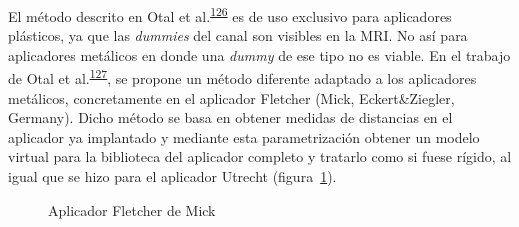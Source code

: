 \documentclass[
  a4paper,
]{scrreprt}
\begin{document}
El método descrito en Otal et
al.\textsuperscript{\protect\hyperlink{ref-otal2019_plastic}{126}} es de
uso exclusivo para aplicadores plásticos, ya que las \emph{dummies} del
canal son visibles en la MRI. No así para aplicadores metálicos en donde
una \emph{dummy} de ese tipo no es viable. En el trabajo de Otal et
al.\textsuperscript{\protect\hyperlink{ref-otal2019_metal}{127}}, se
propone un método diferente adaptado a los aplicadores metálicos,
concretamente en el aplicador Fletcher (Mick, Eckert\&Ziegler, Germany).
Dicho método se basa en obtener medidas de distancias en el aplicador ya
implantado y mediante esta parametrización obtener un modelo virtual
para la biblioteca del aplicador completo y tratarlo como si fuese
rígido, al igual que se hizo para el aplicador Utrecht
(figura~\ref{fig-fletcher}).

\begin{figure}

\begin{minipage}[t]{\linewidth}

{\centering 


}

\end{minipage}%
\newline
\begin{minipage}[t]{\linewidth}

{\centering 


}

\end{minipage}%

\caption{\label{fig-fletcher}Aplicador Fletcher de Mick}

\end{figure}
\end{document}
